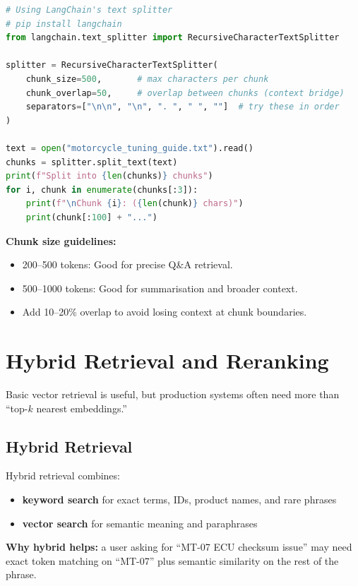\documentclass[12pt, a4paper, oneside]{book}
\begin{document}
\begin{lstlisting}[language=Python, caption={Document chunking}]
# Using LangChain's text splitter
# pip install langchain
from langchain.text_splitter import RecursiveCharacterTextSplitter

splitter = RecursiveCharacterTextSplitter(
    chunk_size=500,       # max characters per chunk
    chunk_overlap=50,     # overlap between chunks (context bridge)
    separators=["\n\n", "\n", ". ", " ", ""]  # try these in order
)

text = open("motorcycle_tuning_guide.txt").read()
chunks = splitter.split_text(text)
print(f"Split into {len(chunks)} chunks")
for i, chunk in enumerate(chunks[:3]):
    print(f"\nChunk {i}: ({len(chunk)} chars)")
    print(chunk[:100] + "...")
\end{lstlisting}

\begin{tipbox}
\textbf{Chunk size guidelines:}
\begin{itemize}[leftmargin=2em]
    \item 200--500 tokens: Good for precise Q\&A retrieval.
    \item 500--1000 tokens: Good for summarisation and broader context.
    \item Add 10--20\% overlap to avoid losing context at chunk boundaries.
\end{itemize}
\end{tipbox}

\section{Hybrid Retrieval and Reranking}

Basic vector retrieval is useful, but production systems often need more than ``top-\(k\) nearest embeddings.''

\subsection{Hybrid Retrieval}
Hybrid retrieval combines:
\begin{itemize}[leftmargin=2em]
    \item \textbf{keyword search} for exact terms, IDs, product names, and rare phrases
    \item \textbf{vector search} for semantic meaning and paraphrases
\end{itemize}

\textbf{Why hybrid helps:} a user asking for ``MT-07 ECU checksum issue'' may need exact token matching on ``MT-07'' plus semantic similarity on the rest of the phrase.
\end{document}
